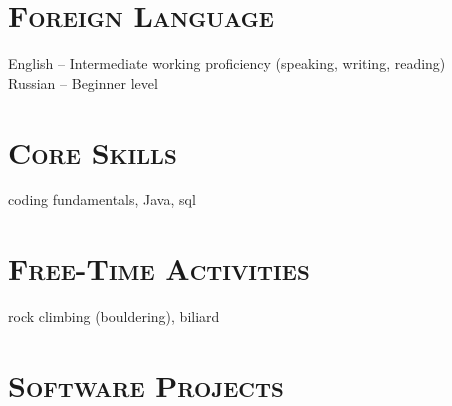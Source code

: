 \documentclass[12pt]{article}
\begin{document}
\section{\textsc{Foreign Language}} 

    English -- Intermediate working proficiency (speaking, writing, reading) \\
    Russian -- Beginner level

\section{\textsc{Core Skills}}
 
    coding fundamentals, Java, sql

\section{\textsc{Free-Time Activities}}

    rock climbing (bouldering), biliard

\pagebreak

\section{\textsc{Software Projects}}
\end{document}
